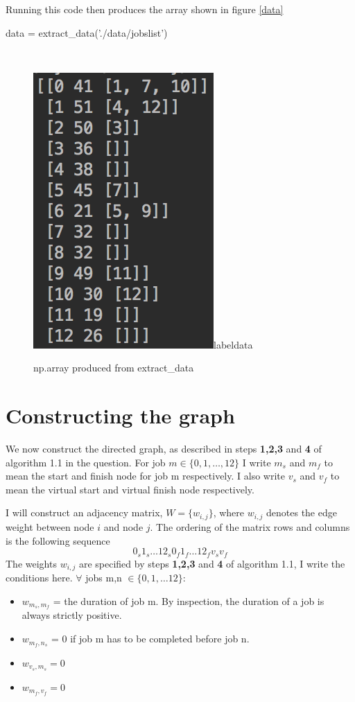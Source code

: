 \documentclass[paper=a4, fontsize=12pt]{scrartcl} %
\numberwithin{equation}{section}       %
\numberwithin{figure}{section}         %
\numberwithin{table}{section}          %
\begin{document}
Running this code then produces the array shown in figure \ref{data}
\begin{python}
data = extract_data('./data/jobslist')
\end{python}

\begin{figure}[t]\
\caption{np.array produced from extract\_data}
\centering
\includegraphics{data}label{data}
\end{figure}

\section{Constructing the graph}
We now construct the directed graph, as described in steps \textbf{1,2,3} and \textbf{4} of algorithm 1.1 in the question. For job $m \in \{ 0,1,\dots, 12 \}$ I write $m_{s}$ and $m_{f}$ to mean the start and finish node for job m respectively. I also write $v_{s}$ and $v_{f}$ to mean the virtual start and virtual finish node respectively.

I will construct an adjacency matrix, $W = \{ w_{i,j} \}$, where $w_{i,j}$ denotes the edge weight between node $i$ and node $j$. The ordering of the matrix rows and columns is the following sequence $$ 0_{s} 1_{s} \dots 12_{s} 0_{f} 1_{f} \dots 12_{f} v_{s} v_{f}$$
The weights $w_{i,j}$ are specified by steps \textbf{1,2,3} and \textbf{4} of algorithm 1.1, I write the conditions here. $\forall$ jobs m,n $\in \{ 0,1,\dots 12\}$:
\begin{itemize}
  \item $w_{m_{s},m_{f}}$ = the duration of job m. By inspection, the duration of a job is always strictly positive.
  \item $w_{m_{f},n_{s}}$ = 0 if job m has to be completed before job n.
  \item $w_{v_{s},m_{s}} = 0$
  \item $w_{m_{f},v_{f}} = 0$
\end{itemize}
\end{document}
